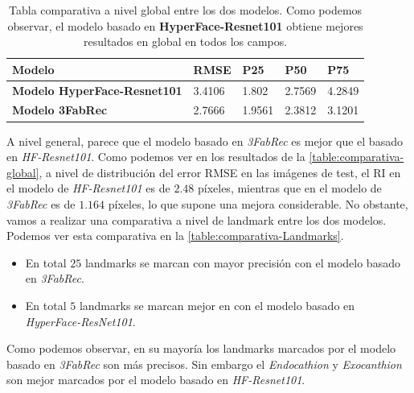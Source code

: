             \begin{table}[!ht]
                \centering
                \caption{Tabla comparativa a nivel global entre los dos modelos. Como podemos observar, el modelo basado en \textbf{HyperFace-Resnet101} obtiene mejores resultados en global en todos los campos.}
                \begin{tabular}{|l|l|l|l|l|}
                \hline
                    \cellcolor{gray!25}\textbf{Modelo} & \cellcolor{gray!25}\textbf{RMSE} & \cellcolor{gray!25}\textbf{P25} & \cellcolor{gray!25}\textbf{P50} & \cellcolor{gray!25}\textbf{P75} \\ \hline
                    \textbf{Modelo HyperFace-Resnet101} & 3.4106 & \cellcolor{green!25}1.802 & 2.7569 & 4.2849 \\ \hline
                    \textbf{Modelo 3FabRec} & \cellcolor{green!25} 2.7666 & 1.9561 & \cellcolor{green!25}2.3812 & \cellcolor{green!25}3.1201 \\ \hline
                \end{tabular}
                \label{table:comparativa-global}
            \end{table}
            
            \medskip

            \noindent A nivel general, parece que el modelo basado en \textit{3FabRec} es mejor que el basado en \textit{HF-Resnet101}. Como podemos ver en los resultados de la \autoref{table:comparativa-global}, a nivel de distribución del error RMSE en las imágenes de test, el RI en el modelo de \textit{HF-Resnet101} es de $2.48$ píxeles, mientras que en el modelo de \textit{3FabRec} es de $1.164$ píxeles, lo que supone una mejora considerable. No obstante, vamos a realizar una comparativa a nivel de landmark entre los dos modelos. Podemos ver esta comparativa en la \autoref{table:comparativa-Landmarks}.

            \begin{itemize}
                \item En total $25$ landmarks se marcan con mayor precisión con el modelo basado en \textit{3FabRec}.
                \item En total $5$ landmarks se marcan mejor en con el modelo basado en \textit{HyperFace-ResNet101}.
            \end{itemize}

            \noindent Como podemos observar, en su mayoría los landmarks marcados por el modelo basado en \textit{3FabRec} son más precisos. Sin embargo el \textit{Endocathion} y \textit{Exocanthion} son mejor marcados por el modelo basado en \textit{HF-Resnet101}.
           
